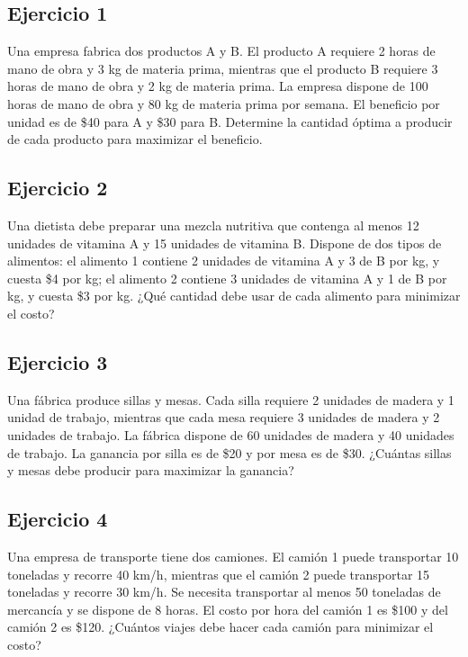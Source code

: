 \documentclass[12pt]{article}
\begin{document}
\subsection*{Ejercicio 1}

Una empresa fabrica dos productos A y B. El producto A requiere 2 horas de mano de obra y 3 kg de materia prima, mientras que el producto B requiere 3 horas de mano de obra y 2 kg de materia prima. La empresa dispone de 100 horas de mano de obra y 80 kg de materia prima por semana. El beneficio por unidad es de \$40 para A y \$30 para B. Determine la cantidad óptima a producir de cada producto para maximizar el beneficio.

\subsection*{Ejercicio 2}

Una dietista debe preparar una mezcla nutritiva que contenga al menos 12 unidades de vitamina A y 15 unidades de vitamina B. Dispone de dos tipos de alimentos: el alimento 1 contiene 2 unidades de vitamina A y 3 de B por kg, y cuesta \$4 por kg; el alimento 2 contiene 3 unidades de vitamina A y 1 de B por kg, y cuesta \$3 por kg. ¿Qué cantidad debe usar de cada alimento para minimizar el costo?

\subsection*{Ejercicio 3}

Una fábrica produce sillas y mesas. Cada silla requiere 2 unidades de madera y 1 unidad de trabajo, mientras que cada mesa requiere 3 unidades de madera y 2 unidades de trabajo. La fábrica dispone de 60 unidades de madera y 40 unidades de trabajo. La ganancia por silla es de \$20 y por mesa es de \$30. ¿Cuántas sillas y mesas debe producir para maximizar la ganancia?

\subsection*{Ejercicio 4}

Una empresa de transporte tiene dos camiones. El camión 1 puede transportar 10 toneladas y recorre 40 km/h, mientras que el camión 2 puede transportar 15 toneladas y recorre 30 km/h. Se necesita transportar al menos 50 toneladas de mercancía y se dispone de 8 horas. El costo por hora del camión 1 es \$100 y del camión 2 es \$120. ¿Cuántos viajes debe hacer cada camión para minimizar el costo?
\end{document}
